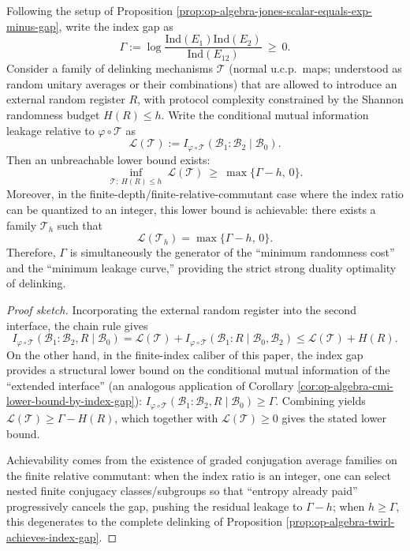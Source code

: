\begin{theorem}\label{thm:op-algebra-optimal-delinking-curve}
Following the setup of Proposition \ref{prop:op-algebra-jones-scalar-equals-exp-minus-gap}, write the index gap as
\[
\Gamma:=\log\frac{\mathrm{Ind}(E_1)\mathrm{Ind}(E_2)}{\mathrm{Ind}(E_{12})}\ \ge\ 0.
\]
Consider a family of delinking mechanisms \(\mathcal{T}\) (normal u.c.p.\ maps; understood as random unitary averages or their combinations) that are allowed to introduce an external random register \(R\), with protocol complexity constrained by the Shannon randomness budget \(H(R)\le h\).
Write the conditional mutual information leakage relative to \(\varphi\circ\mathcal{T}\) as
\[
\mathcal{L}(\mathcal{T})
:=
I_{\varphi\circ\mathcal{T}}(\mathcal{B}_1:\mathcal{B}_2\mid\mathcal{B}_0).
\]
Then an unbreachable lower bound exists:
\[
\boxed{\;
\inf_{\mathcal{T}:\ H(R)\le h}\ \mathcal{L}(\mathcal{T})
\ \ge\ \max\{\Gamma-h,\,0\}.\;}
\]
Moreover, in the finite-depth/finite-relative-commutant case where the index ratio can be quantized to an integer, this lower bound is achievable: there exists a family \(\mathcal{T}_h\) such that
\[
\boxed{\;\mathcal{L}(\mathcal{T}_h)=\max\{\Gamma-h,\,0\}.\;}
\]
Therefore, \(\Gamma\) is simultaneously the generator of the ``minimum randomness cost'' and the ``minimum leakage curve,'' providing the strict strong duality optimality of delinking.
\end{theorem}
\begin{proof}[Proof sketch]
Incorporating the external random register into the second interface, the chain rule gives
\[
I_{\varphi\circ\mathcal{T}}(\mathcal{B}_1:\mathcal{B}_2,R\mid\mathcal{B}_0)
=\mathcal{L}(\mathcal{T})+I_{\varphi\circ\mathcal{T}}(\mathcal{B}_1:R\mid\mathcal{B}_0,\mathcal{B}_2)
\le \mathcal{L}(\mathcal{T})+H(R).
\]
On the other hand, in the finite-index caliber of this paper, the index gap provides a structural lower bound on the conditional mutual information of the ``extended interface'' (an analogous application of Corollary \ref{cor:op-algebra-cmi-lower-bound-by-index-gap}):
\(
I_{\varphi\circ\mathcal{T}}(\mathcal{B}_1:\mathcal{B}_2,R\mid\mathcal{B}_0)\ge\Gamma
\).
Combining yields \(\mathcal{L}(\mathcal{T})\ge \Gamma-H(R)\), which together with \(\mathcal{L}(\mathcal{T})\ge 0\) gives the stated lower bound.
\par
Achievability comes from the existence of graded conjugation average families on the finite relative commutant: when the index ratio is an integer, one can select nested finite conjugacy classes/subgroups so that ``entropy already paid'' progressively cancels the gap, pushing the residual leakage to \(\Gamma-h\); when \(h\ge\Gamma\), this degenerates to the complete delinking of Proposition \ref{prop:op-algebra-twirl-achieves-index-gap}. \qedhere
\end{proof}


